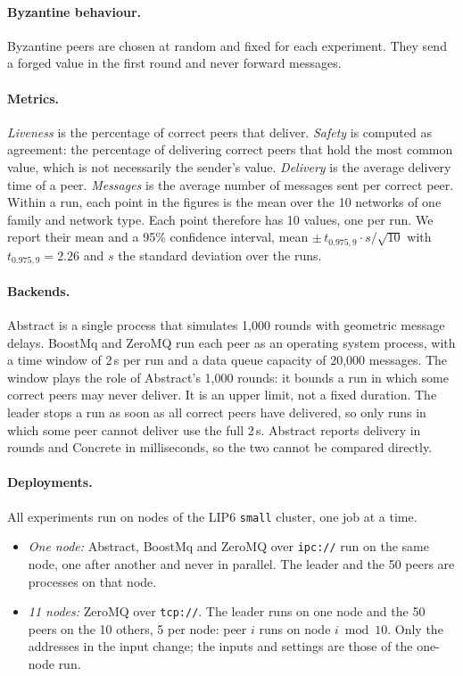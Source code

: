 \documentclass[11pt,a4paper]{article}
\newcommand{\code}[1]{\texttt{#1}}
\begin{document}
\paragraph{Byzantine behaviour.} Byzantine peers are chosen at random and fixed for each experiment.
They send a forged value in the first round and never forward messages.

\paragraph{Metrics.} \emph{Liveness} is the percentage of correct peers that deliver. \emph{Safety}
is computed as agreement: the percentage of delivering correct peers that hold the most common
value, which is not necessarily the sender's value. \emph{Delivery} is the average delivery time of
a peer. \emph{Messages} is the average number of messages sent per correct peer. Within a run, each
point in the figures is the mean over the 10 networks of one family and network type. Each point
therefore has 10 values, one per run. We report their mean and a 95\% confidence interval,
mean $\pm\, t_{0.975,9} \cdot s / \sqrt{10}$ with $t_{0.975,9} = 2.26$ and $s$ the standard
deviation over the runs.

\paragraph{Backends.} Abstract is a single process that simulates 1,000 rounds with geometric
message delays. BoostMq and ZeroMQ run each peer as an operating system process, with a time window
of 2\,s per run and a data queue capacity of 20,000 messages. The window plays the role of
Abstract's 1,000 rounds: it bounds a run in which some correct peers may never deliver. It is an
upper limit, not a fixed duration. The leader stops a run as soon as all correct peers have
delivered, so only runs in which some peer cannot deliver use the full 2\,s. Abstract reports
delivery in rounds and Concrete in milliseconds, so the two cannot be compared directly.

\paragraph{Deployments.} All experiments run on nodes of the LIP6 \code{small} cluster, one job at a
time.
\begin{itemize}
  \item \emph{One node:} Abstract, BoostMq and ZeroMQ over \code{ipc://} run on the same node, one
    after another and never in parallel. The leader and the 50 peers are processes on that node.
  \item \emph{11 nodes:} ZeroMQ over \code{tcp://}. The leader runs on one node and the 50 peers on
    the 10 others, 5 per node: peer $i$ runs on node $i \bmod 10$. Only the addresses in the input
    change; the inputs and settings are those of the one-node run.
\end{itemize}
\end{document}
